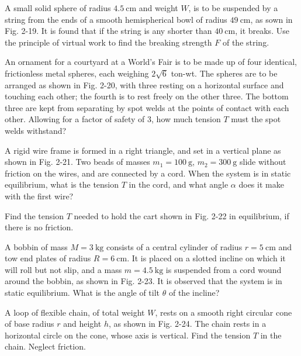 \documentclass[../feynman-lectures-on-physics.tex]{subfiles}
\begin{document}
\begin{questions}
\question A small solid sphere of radius $\SI{4.5}{\centi\meter}$ and weight $W$, is to be suspended by a string from the ends of a smooth hemispherical bowl of radius $\SI{49}{\centi\meter}$, as sown in Fig. 2-19. It is found that if the string is any shorter than $\SI{40}{\centi\meter}$, it breaks. Use the principle of virtual work to find the breaking strength $F$ of the string.

\question An ornament for a courtyard at a World's Fair is to be made up of four identical, frictionless metal spheres, each weighing $2\sqrt{6}$ ton-wt. The spheres are to be arranged as shown in Fig. 2-20, with three resting on a horizontal surface and touching each other; the fourth is to rest freely on the other three. The bottom three are kept from separating by spot welds at the points of contact with each other. Allowing for a factor of safety of $3$, how much tension $T$ must the spot welds withstand?

\question A rigid wire frame is formed in a right triangle, and set in a vertical plane as shown in Fig. 2-21. Two beads of masses $m_1 = \SI{100}{\gram}$, $m_2=\SI{300}{\gram}$ slide without friction on the wires, and are connected by a cord. When the system is in static equilibrium, what is the tension $T$ in the cord, and what angle $\alpha$ does it make with the first wire?

\question Find the tension $T$ needed to hold the cart shown in Fig. 2-22 in equilibrium, if there is no friction.

\question A bobbin of mass $M=\SI{3}{\kilo\gram}$ consists of a central cylinder of radius $r=\SI{5}{\centi\meter}$ and tow end plates of radius $R=\SI{6}{\centi\meter}$. It is placed on a slotted incline on which it will roll but not slip, and a mass $m=\SI{4.5}{\kilo\gram}$ is suspended from a cord wound around the bobbin, as shown in Fig. 2-23. It is observed that the system is in static equilibrium. What is the angle of tilt $\theta$ of the incline?

\question A loop of flexible chain, of total weight $W$, rests on a smooth right circular cone of base radius $r$ and height $h$, as shown in Fig. 2-24. The chain rests in a horizontal circle on the cone, whose axis is vertical. Find the tension $T$ in the chain. Neglect friction.


\end{questions}
\end{document}

